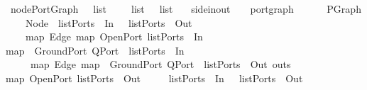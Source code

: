 \ nodePortGraph\ {\isacharcolon}{\isacharcolon}\ {\isachardoublequoteopen}\ list\ {\isasymRightarrow}\ \ {\isasymRightarrow}\ \ list\ {\isasymRightarrow}\ \ list\isanewline
{}\ {\isacharparenleft}\ {\isacharcolon}{\isacharcolon}\ side{\isacharunderscore}in{\isacharunderscore}out{\isacharcomma}\ \ \ \ port{\isacharunderscore}graph{\isachardoublequoteclose}\isanewline
\ \ \ {\isachardoublequoteopen}\ \ {\isacharequal}\ PGraph\isanewline
\ \ \ \ {\isacharbrackleft}Node\ \ {\isacharparenleft}listPorts\ {}\ In\ \ {\isacharat}\ listPorts\ {}\ Out\ \isanewline
\ \ \ \ {\isacharparenleft}map{}\ Edge\ {\isacharparenleft}map\ OpenPort\ {\isacharparenleft}listPorts\ {}\ In\ \isanewline
{}map\ {\isacharparenleft}{\isasymlambda}\ GroundPort\ {\isacharparenleft}QPort\ \ {\isacharparenleft}listPorts\ {}\ In\ \ {\isacharat}\isanewline
\ \ \ \ \ map{}\ Edge\ {\isacharparenleft}map\ {\isacharparenleft}{\isasymlambda}\ GroundPort\ {\isacharparenleft}QPort\ \ {\isacharparenleft}listPorts\ {}\ Out\ outs{\isacharparenright}{\isacharparenright}\isanewline
{}map\ OpenPort\ {\isacharparenleft}listPorts\ {}\ Out\ \isanewline
\ \ \ \ {\isacharparenleft}listPorts\ {}\ In\ \ {\isacharat}\ listPorts\ {}\ Out\ 
